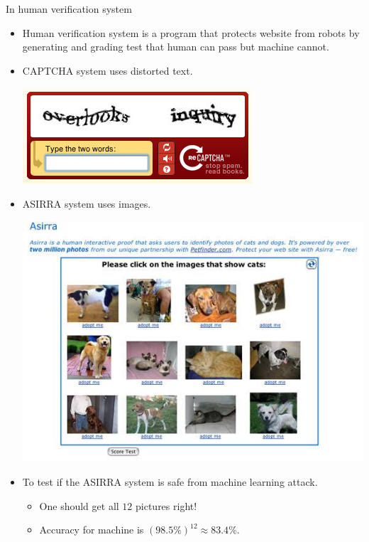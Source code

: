 \documentclass[first=dgreen,second=purple,logo=yellowexc]{aaltoslides}
\begin{document}
{\begin{frame}{In human verification system}
	\begin{itemize}
		\item Human verification system is a program that protects website from robots by generating and grading test that human can pass but machine cannot.
		\item CAPTCHA system \citep{Ahn03captcha} uses distorted text.
		\begin{center}
			\includegraphics[scale=0.2]{./figures/captcha.png}
		\end{center}
		\item ASIRRA system \citep{Elson07asirra} uses images.
		\begin{center}
			\includegraphics[scale=0.2]{./figures/assira.jpg}
		\end{center}
		\item To test if the ASIRRA system is safe from machine learning attack.
		\begin{itemize}
			\footnotesize
			\item One should get all $12$ pictures right!
			\item Accuracy for machine is $(98.5\%)^{12} \approx 83.4\%$.
		\end{itemize}
	\end{itemize}
\end{frame}

}
\end{document}
